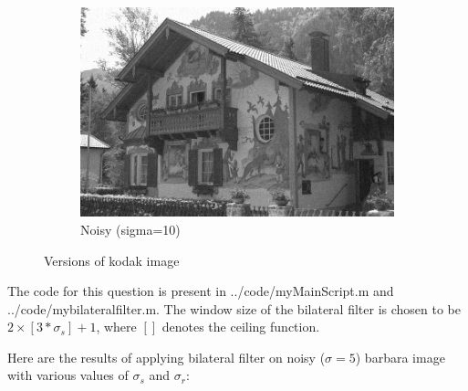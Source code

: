 \documentclass[12pt]{article}
\begin{document}
\begin{figure}[h]
\begin{subfigure}[b]{0.3\textwidth}
        \includegraphics[width=\textwidth]{../images/noisy_kodak_10.png}
        \caption{Noisy (sigma=10)}
        \label{fig:subfig3}
    \end{subfigure}
    
    \caption{Versions of kodak image}
    \label{fig:kodak}
\end{figure}

The code for this question is present in {../code/myMainScript.m} and \\ {../code/mybilateralfilter.m}. The window size of the bilateral filter is chosen to be $2\times [3*\sigma_s] + 1$, where $[]$ denotes the ceiling function.


Here are the results of applying bilateral filter on noisy ($\sigma = 5$) barbara image with various values of $\sigma_s$ and $\sigma_r$:
\end{document}
